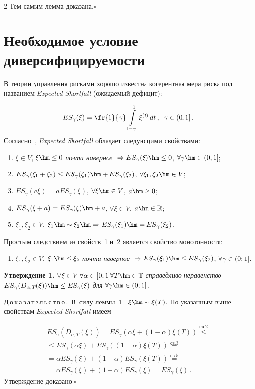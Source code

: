 \begin{multicols}{2}
Тем самым лемма доказана.\hfill$\square$


\section{Необходимое условие диверсифицируемости}

В теории управления рисками хорошо известна когерентная мера риска
под названием \textit{Expected Shortfall} (ожидаемый дефицит):

\noindent
$$
{ES}_\gamma(\xi) = \fr{1}{\gamma} \int\limits_{1-\gamma}^1 \xi^{(t)} \,dt\,,\enskip
\gamma \in  (0,1]\,.
$$
Согласно~\cite{es}, \textit{Expected Shortfall} обладает следующими
свойствами:
\begin{enumerate}
\item $\xi\in V$, $\xi\hm\le0$  \textit{почти наверное} ${}\Rightarrow {ES}_\gamma(\xi)\hm\le0$, 
$\forall \gamma\hm \in (0;1]$;
\item ${ES}_\gamma(\xi_1+\xi_2) \le {ES}_\gamma(\xi_1) \hm+ {ES}_\gamma(\xi_2)$, 
$\forall \xi_1,\xi_2\hm\in V$;
\item ${ES}_\gamma(a\xi) = a {ES}_\gamma(\xi)$, $\forall \xi\hm\in V$, $a\hm\ge 0$;
\item ${ES}_\gamma(\xi+a) = {ES}_\gamma(\xi)\hm+a$, $\forall \xi\in V$, $a\hm\in\mathbb{R}$;
\item $\xi_1,\xi_2\in V$, $\xi_1\hm\sim\xi_2 \hm\Rightarrow{ES}_\gamma(\xi_1)\hm={ES}_\gamma(\xi_2)$.
\end{enumerate}

Простым следствием из свойств~1 и~2 является свойство монотонности:
\begin{enumerate}[6.]
\item $\xi_1,\xi_2\in V$, $\xi_1 \hm\le \xi_2$ \textit{почти наверное} $
{}\Rightarrow {ES}_\gamma(\xi_1) \hm\le {ES}_\gamma(\xi_2)$, $\forall \gamma \in (0;1]$.
\end{enumerate}

\medskip

\noindent
\textbf{Утверждение 1.} \textit{$\forall \xi \in V$ $\forall \alpha \in [0;1] 
\forall T \hm\in \classT$ справедливо неравенство 
${ES}_\gamma ( D_{\alpha , T}(\xi)) \hm\le {ES}_\gamma (\xi)$  для $\forall
\gamma \hm\in (0;1]$. }

\smallskip

\noindent
Д\,о\,к\,а\,з\,а\,т\,е\,л\,ь\,с\,т\,в\,о\,.\ В~силу леммы~1 \ $\xi \hm\sim \xi(T)$. По
указанным выше свойствам \textit{Expected Shortfall} имеем

\noindent
\begin{multline*}
{ES}_\gamma ( D_{\alpha , T}(\xi)) =
{ES}_\gamma ( \alpha \xi + (1 - \alpha) \xi(T)) \stackrel{\text{св.2}}{\le}{} \\
{}\le {ES}_\gamma ( \alpha \xi ) + {ES}_\gamma  ( (1 - \alpha) \xi(T)) \stackrel{\text{св.3}}{=}{}\\
{}=\alpha {ES}_\gamma ( \xi ) + (1 - \alpha) {ES}_\gamma ( \xi(T)) \stackrel{\text{св.5}}{=}  \\
= \alpha {ES}_\gamma ( \xi ) + (1 - \alpha) {ES}_\gamma ( \xi ) =
{ES}_\gamma ( \xi )\,.
\end{multline*}
Утверждение доказано.\hfill$\square$


\end{multicols}
